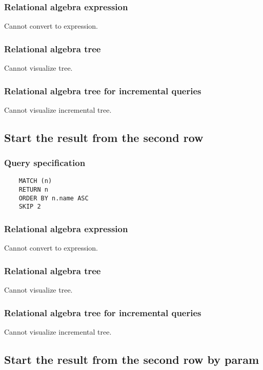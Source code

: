 	\subsubsection*{Relational algebra expression}

	Cannot convert to expression.

	\subsubsection*{Relational algebra tree}

	Cannot visualize tree.

	\subsubsection*{Relational algebra tree for incremental queries}

	Cannot visualize incremental tree.
	\subsection{Start the result from the second row}

	\subsubsection*{Query specification}

	\begin{lstlisting}
	MATCH (n)
	RETURN n
	ORDER BY n.name ASC
	SKIP 2
	\end{lstlisting}


	\subsubsection*{Relational algebra expression}

	Cannot convert to expression.

	\subsubsection*{Relational algebra tree}

	Cannot visualize tree.

	\subsubsection*{Relational algebra tree for incremental queries}

	Cannot visualize incremental tree.
	\subsection{Start the result from the second row by param}


